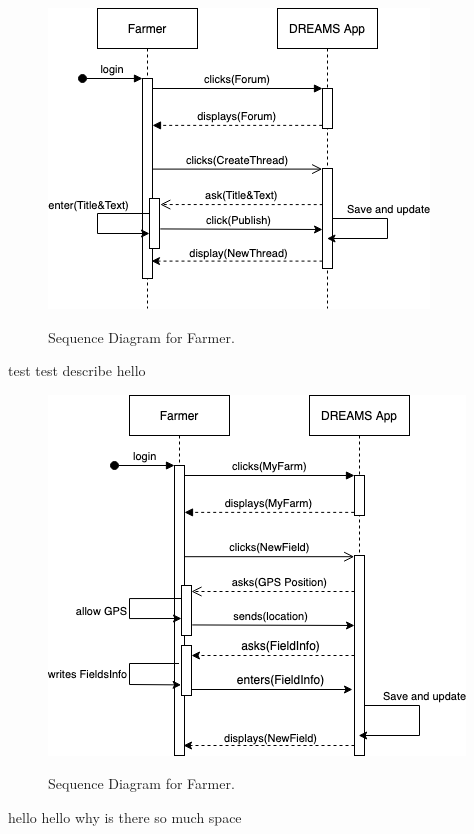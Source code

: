 \begin{figure}[hbt!]
\centering
\includegraphics[scale=0.6]{Files/sequence_disgrams/thePNGs/farmer_createThread.png}\\
\caption{\label{tab:addOne{figure_counter}}Sequence Diagram for Farmer.}
\end{figure}

test test describe hello



\begin{figure}[hbt!]
\centering
\includegraphics[scale=0.6]{Files/sequence_disgrams/thePNGs/farmer_newField.png}\\
\caption{\label{tab:addOne{figure_counter}}Sequence Diagram for Farmer.}
\end{figure}

hello hello why is there so much space 




